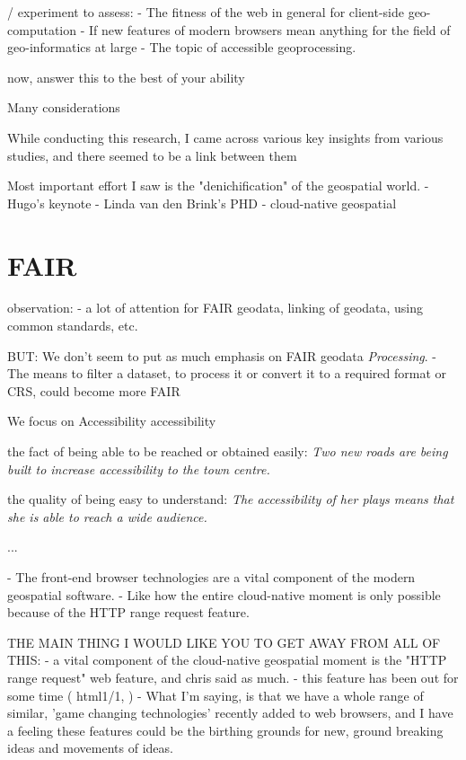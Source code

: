 / experiment to assess: 
- The fitness of the web in general for client-side geo-computation
- If new features of modern browsers mean anything for the field of geo-informatics at large 
- The topic of accessible geoprocessing.

now, answer this to the best of your ability

Many considerations


While conducting this research, I came across various key insights from various studies, and there seemed to be a link between them 

Most important effort I saw is the "denichification" of the geospatial world.
- Hugo's keynote
- Linda van den Brink's PHD
- cloud-native geospatial 



\section{FAIR}

observation: 
- a lot of attention for FAIR geodata, linking of geodata, using common standards, etc. 

BUT: We don't seem to put as much emphasis on FAIR geodata \emph{Processing}. 
- The means to filter a dataset, to process it or convert it to a required format or CRS, could become more FAIR

We focus on Accessibility
accessibility

\m{->} the fact of being able to be reached or obtained easily:
\textit{Two new roads are being built to increase accessibility to the town centre.}

\m{->} the quality of being easy to understand: 
\textit{The accessibility of her plays means that she is able to reach a wide audience.}

...

- The front-end browser technologies are a vital component of the modern geospatial software.
- Like how the entire cloud-native moment is only possible because of the HTTP range request feature. 


THE MAIN THING I WOULD LIKE YOU TO GET AWAY FROM ALL OF THIS:
- a vital component of the cloud-native geospatial moment is the "HTTP range request" web feature, and chris said as much.
  - this feature has been out for some time ( html1/1, )
- What I'm saying, is that we have a whole range of similar, 'game changing technologies' recently added to web browsers, and I have a feeling these features could be the birthing grounds for new, ground breaking ideas and movements of ideas. 

